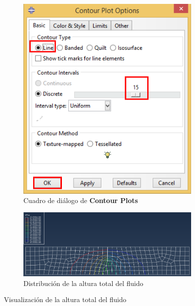 \begin{itemize}
\begin{figure}[!h]
    \begin{subfigure}[!h]{0.40\textwidth}
      \includegraphics[width=\textwidth]{./body/images/post03.pdf}
      \caption{Cuadro de diálogo de \textbf{Contour Plots}}
      \label{post03}
    \end{subfigure}%
    \begin{subfigure}[!h]{0.60\textwidth}
      \includegraphics[width=\textwidth]{./body/images/post04}
      \caption{Distribución de la altura total del fluido}
      \label{post04}
    \end{subfigure}%
    \caption{Visualización de la altura total del fluido}
  \end{figure}


\end{itemize}
